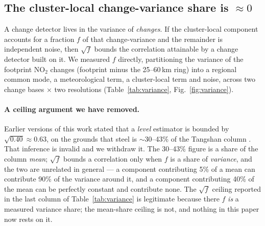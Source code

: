 \documentclass[11pt,a4paper]{article}
\providecommand{\ce}[1]{\ensuremath{\mathrm{#1}}}
\begin{document}
\subsection{The cluster-local change-variance share is $\approx0$}
\label{sec:variance}

A change detector lives in the variance of \emph{changes}. If the cluster-local component
accounts for a fraction $f$ of that change-variance and the remainder is independent noise, then
$\sqrt{f}$ bounds the correlation attainable by a change detector built on it. We measured $f$
directly, partitioning the variance of the footprint \ce{NO_2} changes (footprint minus the
25--60\,km ring) into a regional common mode, a meteorological term, a cluster-local term and
noise, across two change bases $\times$ two resolutions (Table~\ref{tab:variance},
Fig.~\ref{fig:variance}).

\paragraph{A ceiling argument we have removed.} Earlier versions of this work stated that a
\emph{level} estimator is bounded by $\sqrt{0.40}\approx0.63$, on the grounds that steel is
$\sim$30--43\% of the Tangshan column \citep{wen_2024}. That inference is invalid and we withdraw
it. The 30--43\% figure is a share of the column \emph{mean}; $\sqrt{f}$ bounds a correlation
only when $f$ is a share of \emph{variance}, and the two are unrelated in general --- a component
contributing 5\% of a mean can contribute 90\% of the variance around it, and a component
contributing 40\% of the mean can be perfectly constant and contribute none. The $\sqrt{f}$
ceiling reported in the last column of Table~\ref{tab:variance} is legitimate because there $f$
\emph{is} a measured variance share; the mean-share ceiling is not, and nothing in this paper
now rests on it.
\end{document}
